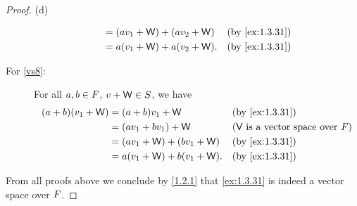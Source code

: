 \begin{proof}{(d)}
\begin{description}
\begin{align*}
                                   & = (av_1 + \W) + (av_2 + \W)  &  & \text{(by \cref{ex:1.3.31})}                  \\
                                   & = a(v_1 + \W) + a(v_2 + \W). &  & \text{(by \cref{ex:1.3.31})}
      \end{align*}
    \item[For \ref{vs8}:]
      For all \(a, b \in \mathit{F}\), \(v + \mathsf{W} \in S\), we have
      \begin{align*}
        (a + b) (v_1 + \W) & = (a + b) v_1 + \W           &  & \text{(by \cref{ex:1.3.31})}                  \\
                           & = (av_1 + bv_1) + \W         &  & \text{(\(\V\) is a vector space over \(\F\))} \\
                           & = (av_1 + \W) + (bv_1 + \W)  &  & \text{(by \cref{ex:1.3.31})}                  \\
                           & = a(v_1 + \W) + b(v_1 + \W). &  & \text{(by \cref{ex:1.3.31})}
      \end{align*}
  \end{description}
  From all proofs above we conclude by \cref{1.2.1} that \cref{ex:1.3.31} is indeed a vector space over \(\mathit{F}\).
\end{proof}
